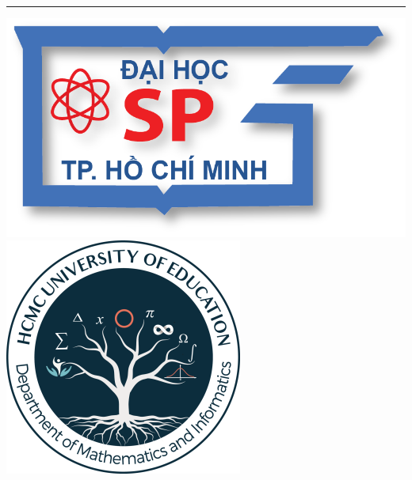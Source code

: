 \documentclass[12pt, %
twoside, %
singlespacing, %
headsepline, %
]{ThesisHCMUE}
\author{NGUYỄN VĂN A.}
\begin{document}
\frontmatter %

\pagestyle{plain}


\begin{titlepage}
\border{1in} %

\begin{center}
\\ %

\\ %

\\ %
\rule{6cm}{1pt}

\vspace{1cm} %
\includegraphics[scale=0.2]{logo/logo.png}\hspace{1cm}
\includegraphics[scale=0.5]{logo/logokhoa.png}


\end{center}
\end{titlepage}
\end{document}
